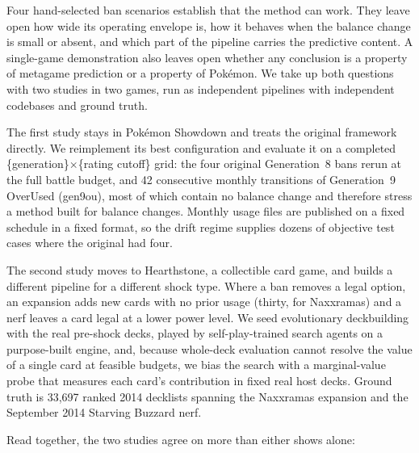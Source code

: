 \documentclass[journal]{IEEEtran}
\newcommand{\pkmn}{Pok\'emon}
\begin{document}
Four hand-selected ban scenarios establish that the method can work.
They leave open how wide its operating envelope is, how it behaves when
the balance change is small or absent, and which part of the pipeline
carries the predictive content. A single-game
demonstration also leaves open whether any conclusion is a property of
metagame prediction or a property of \pkmn{}. We take up both questions
with two studies in two games, run as independent pipelines with
independent codebases and ground truth.

The first study stays in \pkmn{} Showdown and treats the original
framework directly. We reimplement its best configuration and evaluate it
on a completed \{generation\}$\times$\{rating cutoff\} grid: the four
original Generation~8 bans rerun at the full battle budget, and 42
consecutive monthly transitions of Generation~9 OverUsed (gen9ou), most
of which contain no balance change and therefore stress a method built
for balance changes. Monthly usage files are published on a fixed
schedule in a fixed format, so the drift regime supplies dozens of
objective test cases where the original had four.

The second study moves to Hearthstone, a collectible card game, and
builds a different pipeline for a different shock type. Where a ban
removes a legal option, an expansion adds new cards with no prior
usage (thirty, for Naxxramas) and a nerf leaves a card legal at a lower power level. We seed
evolutionary deckbuilding with the real pre-shock decks, played by
self-play-trained search agents on a purpose-built engine, and, because
whole-deck evaluation cannot resolve the value of a single card at
feasible budgets, we bias the search with a marginal-value probe that
measures each card's contribution in fixed real host decks. Ground truth
is 33{,}697 ranked 2014 decklists spanning the Naxxramas expansion and
the September 2014 Starving Buzzard nerf.

Read together, the two studies agree on more than either shows alone:
\end{document}
